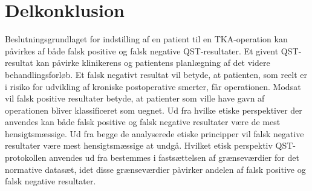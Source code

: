 \section{Delkonklusion}
Beslutningsgrundlaget for indstilling af en patient til en TKA-operation kan påvirkes af både falsk positive og falsk negative QST-resultater. Et givent QST-resultat kan påvirke klinikerens og patientens planlægning af det videre behandlingsforløb. Et falsk negativt resultat vil betyde, at patienten, som reelt er i risiko for udvikling af kroniske postoperative smerter, får operationen. Modsat vil falsk positive resultater betyde, at patienter som ville have gavn af operationen bliver klassificeret som uegnet. Ud fra hvilke etiske perspektiver der anvendes kan både falsk positive og falsk negative resultater være de mest hensigtsmæssige. Ud fra begge de analyserede etiske principper vil falsk negative resultater være mest hensigtsmæssige at undgå. Hvilket etisk perspektiv QST-protokollen anvendes ud fra bestemmes i fastsættelsen af grænseværdier for det normative datasæt, idet disse grænseværdier påvirker andelen af falsk positive og falsk negative resultater. 


